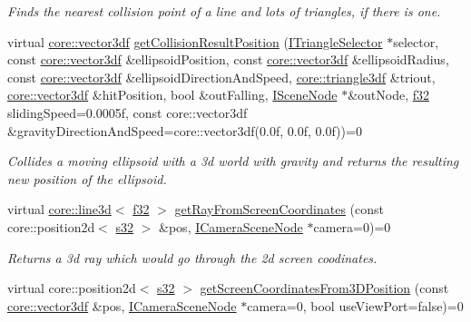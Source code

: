\begin{DoxyCompactItemize}
\begin{DoxyCompactList}\small\item\em Finds the nearest collision point of a line and lots of triangles, if there is one. \end{DoxyCompactList}\item 
virtual \hyperlink{namespaceirr_1_1core_ae6e2b2a6c552833ebbd5b7463d03586b}{core\+::vector3df} \hyperlink{classirr_1_1scene_1_1ISceneCollisionManager_a4a1b1bdf49ec8dd3d4de8b502409ee00}{get\+Collision\+Result\+Position} (\hyperlink{classirr_1_1scene_1_1ITriangleSelector}{I\+Triangle\+Selector} $\ast$selector, const \hyperlink{namespaceirr_1_1core_ae6e2b2a6c552833ebbd5b7463d03586b}{core\+::vector3df} \&ellipsoid\+Position, const \hyperlink{namespaceirr_1_1core_ae6e2b2a6c552833ebbd5b7463d03586b}{core\+::vector3df} \&ellipsoid\+Radius, const \hyperlink{namespaceirr_1_1core_ae6e2b2a6c552833ebbd5b7463d03586b}{core\+::vector3df} \&ellipsoid\+Direction\+And\+Speed, \hyperlink{namespaceirr_1_1core_a8983bda2678a7a67d97bf3c7be6c31c7}{core\+::triangle3df} \&triout, \hyperlink{namespaceirr_1_1core_ae6e2b2a6c552833ebbd5b7463d03586b}{core\+::vector3df} \&hit\+Position, bool \&out\+Falling, \hyperlink{classirr_1_1scene_1_1ISceneNode}{I\+Scene\+Node} $\ast$\&out\+Node, \hyperlink{namespaceirr_a0277be98d67dc26ff93b1a6a1d086b07}{f32} sliding\+Speed=0.\+0005f, const core\+::vector3df \&gravity\+Direction\+And\+Speed=core\+::vector3df(0.\+0f, 0.\+0f, 0.\+0f))=0
\begin{DoxyCompactList}\small\item\em Collides a moving ellipsoid with a 3d world with gravity and returns the resulting new position of the ellipsoid. \end{DoxyCompactList}\item 
virtual \hyperlink{classirr_1_1core_1_1line3d}{core\+::line3d}$<$ \hyperlink{namespaceirr_a0277be98d67dc26ff93b1a6a1d086b07}{f32} $>$ \hyperlink{classirr_1_1scene_1_1ISceneCollisionManager_adb95809ed422e138405f30844740666b}{get\+Ray\+From\+Screen\+Coordinates} (const core\+::position2d$<$ \hyperlink{namespaceirr_ac66849b7a6ed16e30ebede579f9b47c6}{s32} $>$ \&pos, \hyperlink{classirr_1_1scene_1_1ICameraSceneNode}{I\+Camera\+Scene\+Node} $\ast$camera=0)=0
\begin{DoxyCompactList}\small\item\em Returns a 3d ray which would go through the 2d screen coodinates. \end{DoxyCompactList}\item 
virtual core\+::position2d$<$ \hyperlink{namespaceirr_ac66849b7a6ed16e30ebede579f9b47c6}{s32} $>$ \hyperlink{classirr_1_1scene_1_1ISceneCollisionManager_a6032377ff769e42c3e28547794f015ea}{get\+Screen\+Coordinates\+From3\+D\+Position} (const \hyperlink{namespaceirr_1_1core_ae6e2b2a6c552833ebbd5b7463d03586b}{core\+::vector3df} \&pos, \hyperlink{classirr_1_1scene_1_1ICameraSceneNode}{I\+Camera\+Scene\+Node} $\ast$camera=0, bool use\+View\+Port=false)=0

\end{DoxyCompactItemize}
